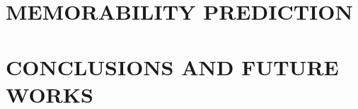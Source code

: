 \documentclass[sigconf]{acmart}
\begin{document}
\section{MEMORABILITY PREDICTION} %











\section{CONCLUSIONS AND FUTURE WORKS}




\end{document}
